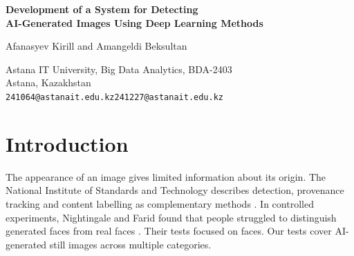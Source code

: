 \documentclass[11pt,a4paper]{article}
\begin{document}
\raggedbottom
\begin{center}
{\LARGE\bfseries Development of a System for Detecting\\[3pt] AI-Generated Images Using Deep Learning Methods\par}
\vspace{10pt}
{\large Afanasyev Kirill and Amangeldi Beksultan\par}
\vspace{4pt}
Astana IT University, Big Data Analytics, BDA-2403\\
Astana, Kazakhstan\\[3pt]
{\small\texttt{241064@astanait.edu.kz}\enspace\textbar\enspace\texttt{241227@astanait.edu.kz}}
\end{center}
\vspace{6pt}
\begin{abstract}
Detectors for AI-generated images can lose accuracy when the generator or image processing changes. We compared a 50-layer residual network (ResNet-50) with a linear classifier on frozen Contrastive Language-Image Pre-training (CLIP) features. The Tiny-GenImage mirror contained 34,998 images after duplicate removal. We held out Midjourney from training and validation and evaluated both models on the same test images across three seeds. We report F1, the harmonic mean of precision and recall, and the false-positive rate (FPR). From epoch 1 to epoch 40, ResNet-50 mean F1 rose from 0.910 to 0.982 on seen images and fell from 0.310 to 0.166 on unseen images. On original unseen images, CLIP reached 0.746 F1 and led epoch-40 ResNet-50 by 0.581 (paired 95\% confidence interval [0.561, 0.600]). Mean FPR was 0.016 for ResNet-50 and 0.061 for CLIP. JPEG recompression reduced unseen F1 for both models. Downsampling to $112\times112$ raised unseen FPR to 0.070 for ResNet-50 and 0.561 for CLIP. Lowering the cutoff to 0.05 raised ResNet-50 unseen F1 to 0.292 and FPR to 0.037. Neither model reached the 0.80 unseen F1 target at threshold 0.50. The findings are exploratory because the study uses one held-out generator and includes earlier pilot images.
\end{abstract}


\section{Introduction}
The appearance of an image gives limited information about its origin. The National Institute of Standards and Technology describes detection, provenance tracking and content labelling as complementary methods \cite{r1}. In controlled experiments, Nightingale and Farid found that people struggled to distinguish generated faces from real faces \cite{r2}. Their tests focused on faces. Our tests cover AI-generated still images across multiple categories.
\end{document}
